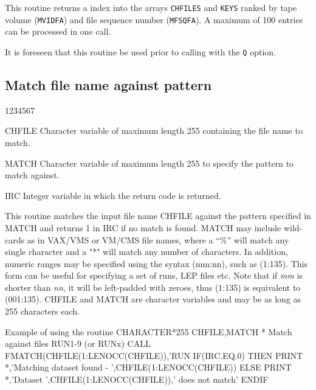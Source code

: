 This routine returns a index into the arrays {\tt CHFILES}
and {\tt KEYS} ranked by tape volume ({\tt MVIDFA}) and
file sequence number ({\tt MFSQFA}). A maximum of 100
entries can be processed in one call.

It is foreseen that this routine be used prior to calling
 with the {\tt Q} option.

\subsection{Match file name against pattern}
\begin{DLtt}{1234567}
\item[CHFILE]
Character variable of maximum length 255 containing the
file name to match.
\item[MATCH]
Character variable of maximum length 255 to specify the
pattern to match against.
\item[IRC]
Integer variable in which the return code is returned.
\end{DLtt}
\par
This routine matches the input file name CHFILE against the
pattern specified in MATCH and returns 1 in IRC if no match
is found. MATCH may include wild-cards as in VAX/VMS or
VM/CMS file names, where a ``\%'' will match any single character
and a "*" will match any number of characters.
In addition, numeric ranges may be specified using the syntax
(mm:nn), such as (1:135). This form can be useful for specifying
a set of runs, LEP files etc.
Note that if {\it mm} is shorter than {\it nn}, it will
be left-padded with zeroes, thus (1:135) is equivalent to (001:135).
CHFILE and MATCH are character variables and may be as long as 255
characters each.
\begin{XMPt}{Example of using the routine \protect{}}
      CHARACTER*255 CHFILE,MATCH
*     Match against files RUN1-9 (or RUNx)
      CALL FMATCH(CHFILE(1:LENOCC(CHFILE)),'RUN%
      IF(IRC.EQ.0) THEN
         PRINT *,'Matching dataset found - ',CHFILE(1:LENOCC(CHFILE))
      ELSE
         PRINT *,'Dataset ',CHFILE(1:LENOCC(CHFILE)),' does not match'
      ENDIF
\end{XMPt}
